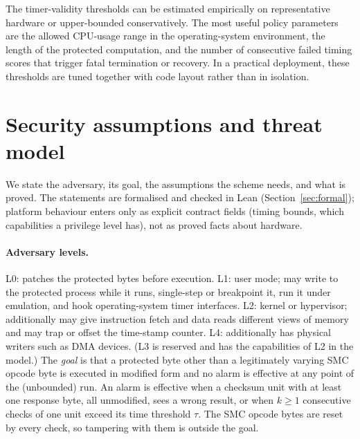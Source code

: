 \documentclass[11pt]{article}
\begin{document}
The timer-validity thresholds can be estimated empirically on representative
hardware or upper-bounded conservatively.  The most useful policy parameters are
the allowed CPU-usage range in the operating-system environment, the length of
the protected computation, and the number of consecutive failed timing scores that
trigger fatal termination or recovery.  In a practical deployment, these
thresholds are tuned together with code layout rather than in isolation.

\section{Security assumptions and threat model}\label{sec:assumptions}

We state the adversary, its goal, the assumptions the scheme needs, and what is proved.  The statements are formalised and checked in Lean (Section~\ref{sec:formal}); platform behaviour enters only as explicit contract fields (timing bounds, which capabilities a privilege level has), not as proved facts about hardware.

\paragraph{Adversary levels.}
L0: patches the protected bytes before execution.
L1: user mode; may write to the protected process while it runs, single-step or breakpoint it, run it under emulation, and hook operating-system timer interfaces.
L2: kernel or hypervisor; additionally may give instruction fetch and data reads different views of memory and may trap or offset the time-stamp counter.
L4: additionally has physical writers such as DMA devices.
(L3 is reserved and has the capabilities of L2 in the model.)
The \emph{goal} is that a protected byte other than a legitimately varying SMC opcode byte is executed in modified form and no alarm is effective at any point of the (unbounded) run.
An alarm is effective when a checksum unit with at least one response byte, all unmodified, sees a wrong result, or when $k\ge 1$ consecutive checks of one unit exceed its time threshold $\tau$.
The SMC opcode bytes are reset by every check, so tampering with them is outside the goal.
\end{document}
